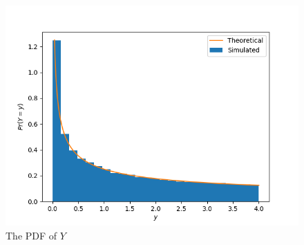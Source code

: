 \begin{figure}[!hbt]
    \centering
	\includegraphics[width=\columnwidth]{solutions/adv/st/2019/43/Figures/Figure_1.png}
    \caption{The PDF of $Y$}
    \label{st/2019/43/CDF_Y}
\end{figure}

